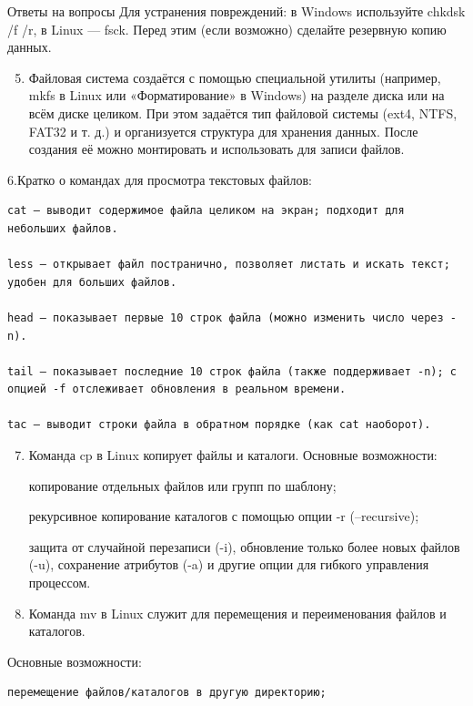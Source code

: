 \documentclass[
  ignorenonframetext,
  aspectratio=169,
  russian,
]{beamer}
\providecommand{\tightlist}{%
  \setlength{\itemsep}{0pt}\setlength{\parskip}{0pt}}
\begin{document}
\begin{frame}[fragile]{Ответы на вопросы}
Для устранения повреждений: в Windows используйте chkdsk /f /r, в Linux
--- fsck. Перед этим (если возможно) сделайте резервную копию данных.

\begin{enumerate}[<+->]
\setcounter{enumi}{4}
\tightlist
\item
  Файловая система создаётся с помощью специальной утилиты (например,
  mkfs в Linux или «Форматирование» в Windows) на разделе диска или на
  всём диске целиком. При этом задаётся тип файловой системы (ext4,
  NTFS, FAT32 и т. д.) и организуется структура для хранения данных.
  После создания её можно монтировать и использовать для записи файлов.
\end{enumerate}

6.Кратко о командах для просмотра текстовых файлов:

\begin{verbatim}
cat — выводит содержимое файла целиком на экран; подходит для небольших файлов.

less — открывает файл постранично, позволяет листать и искать текст; удобен для больших файлов.

head — показывает первые 10 строк файла (можно изменить число через -n).

tail — показывает последние 10 строк файла (также поддерживает -n); с опцией -f отслеживает обновления в реальном времени.

tac — выводит строки файла в обратном порядке (как cat наоборот). 
\end{verbatim}

\begin{enumerate}[<+->]
\setcounter{enumi}{6}
\item
  Команда cp в Linux копирует файлы и каталоги. Основные возможности:

  копирование отдельных файлов или групп по шаблону;

  рекурсивное копирование каталогов с помощью опции -r (--recursive);

  защита от случайной перезаписи (-i), обновление только более новых
  файлов (-u), сохранение атрибутов (-a) и другие опции для гибкого
  управления процессом.
\item
  Команда mv в Linux служит для перемещения и переименования файлов и
  каталогов.
\end{enumerate}

Основные возможности:

\begin{verbatim}
перемещение файлов/каталогов в другую директорию;


\end{verbatim}
\end{frame}
\end{document}

